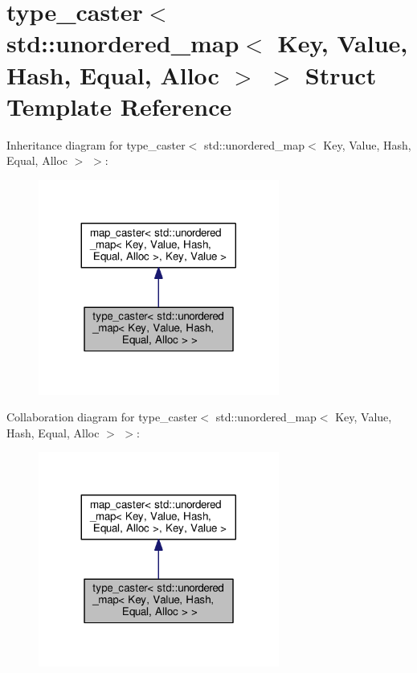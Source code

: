 \hypertarget{structtype__caster_3_01std_1_1unordered__map_3_01_key_00_01_value_00_01_hash_00_01_equal_00_01_alloc_01_4_01_4}{}\section{type\+\_\+caster$<$ std\+:\+:unordered\+\_\+map$<$ Key, Value, Hash, Equal, Alloc $>$ $>$ Struct Template Reference}
\label{structtype__caster_3_01std_1_1unordered__map_3_01_key_00_01_value_00_01_hash_00_01_equal_00_01_alloc_01_4_01_4}


Inheritance diagram for type\+\_\+caster$<$ std\+:\+:unordered\+\_\+map$<$ Key, Value, Hash, Equal, Alloc $>$ $>$\+:
\nopagebreak
\begin{figure}[H]
\begin{center}
\leavevmode
\includegraphics[width=224pt]{structtype__caster_3_01std_1_1unordered__map_3_01_key_00_01_value_00_01_hash_00_01_equal_00_01_alloc_01_4_01_4__inherit__graph}
\end{center}
\end{figure}


Collaboration diagram for type\+\_\+caster$<$ std\+:\+:unordered\+\_\+map$<$ Key, Value, Hash, Equal, Alloc $>$ $>$\+:
\nopagebreak
\begin{figure}[H]
\begin{center}
\leavevmode
\includegraphics[width=224pt]{structtype__caster_3_01std_1_1unordered__map_3_01_key_00_01_value_00_01_hash_00_01_equal_00_01_alloc_01_4_01_4__coll__graph}
\end{center}
\end{figure}
